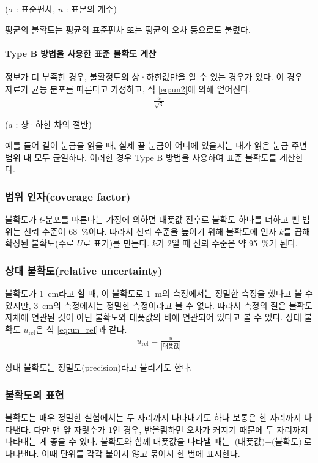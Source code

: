 \documentclass{GSHS-chemexp}
\begin{document}
	($\sigma$ : 표준편차, $n$ : 표본의 개수)
	
	평균의 불확도는 평균의 표준편차 또는 평균의 오차 등으로도 불렸다.
	\cite{Stephanie_Bell}
	
	\paragraph{Type B 방법을 사용한 표준 불확도 계산}
	정보가 더 부족한 경우, 불확정도의 상·하한값만을 알 수 있는 경우가 있다.
	이 경우 자료가 균등 분포를 따른다고 가정하고,
	식 \ref{eq:un2}에 의해 얻어진다.
	\begin{gather}
	\frac{a}{\sqrt{3}} \label{eq:un2}
	\end{gather}
	
	($a$ : 상·하한 차의 절반)
	
	예를 들어 길이 눈금을 읽을 때, 실제 끝 눈금이 어디에 있을지는
	내가 읽은 눈금 주변 범위 내 모두 균일하다. 이러한 경우 Type B 방법을
	사용하여 표준 불확도를 계산한다.
	\cite{Stephanie_Bell}
	
	\subsubsection{범위 인자(coverage factor)}
	불확도가 $t$-분포를 따른다는 가정에 의하면 대푯값 전후로
	불확도 하나를 더하고 뺀 범위는 신뢰 수준이 \SI{68}{\percent}이다.
	따라서 신뢰 수준을 높이기 위해 불확도에 인자 $k$를 곱해
	확장된 불확도(주로 $U$로 표기)를 만든다. $k$가 2일 때
	신뢰 수준은 약 \SI{95}{\percent}가 된다.
	
	\subsubsection{상대 불확도(relative uncertainty)}
	불확도가 \SI{1}{\centi\metre}라고 할 때, 이 불확도로
	\SI{1}{\metre}의 측정에서는 정밀한 측정을 했다고 볼 수 있지만,
	\SI{3}{\centi\metre}의 측정에서는 정밀한 측정이라고 볼 수 없다.
	따라서 측정의 질은 불확도 자체에 연관된 것이 아닌 불확도와 대푯값의
	비에 연관되어 있다고 볼 수 있다. 상대 불확도 $u_{\mathrm{rel}}$은
	식 \ref{eq:un_rel}과 같다.
	\begin{gather}
	u_{\mathrm{rel}} = \frac{u}{|\text{대푯값}|} \label{eq:un_rel}
	\end{gather}
	
	상대 불확도는 정밀도(precision)라고 불리기도 한다.\cite{Taylor_John1}
	
	\subsubsection{불확도의 표현}
	불확도는 매우 정밀한 실험에서는 두 자리까지 나타내기도 하나
	보통은 한 자리까지 나타낸다. 다만 맨 앞 자릿수가 1인 경우,
	반올림하면 오차가 커지기 때문에 두 자리까지 나타내는 게 좋을 수 있다.
	불확도와 함께 대푯값을 나타낼 때는
	$\text{(대푯값)}\pm\text{(불확도)}$로 나타낸다.
	이때 단위를 각각 붙이지 않고 묶어서 한 번에 표시한다.
	
\end{document}
